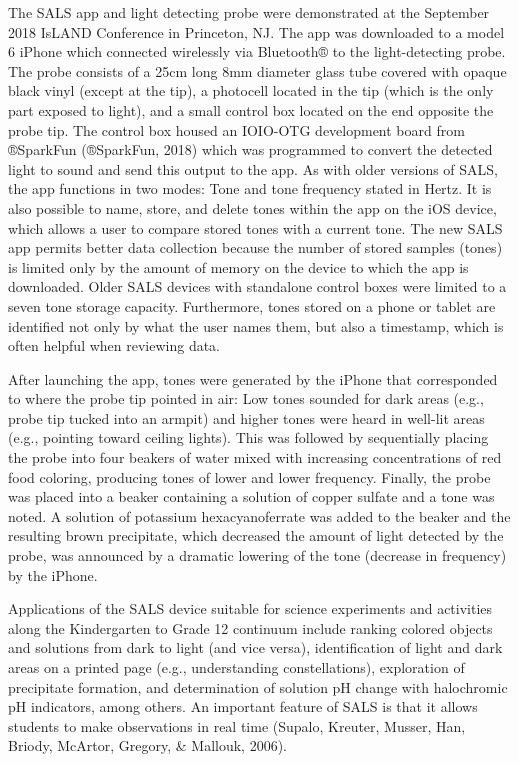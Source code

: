 \documentclass[11.5pt]{sig-alternate} %
\begin{document}
\begin{large}
The SALS app and light detecting probe were demonstrated at the September 2018 IsLAND Conference in Princeton, NJ. The app was downloaded to a model 6 iPhone which connected wirelessly via Bluetooth® to the light-detecting probe. The probe consists of a 25cm long 8mm diameter glass tube covered with opaque black vinyl (except at the tip), a photocell located in the tip (which is the only part exposed to light), and a small control box located on the end opposite the probe tip. The control box housed an IOIO-OTG development board from ®SparkFun (®SparkFun, 2018) which was programmed to convert the detected light to sound and send this output to the app. As with older versions of SALS, the app functions in two modes: Tone and tone frequency stated in Hertz. It is also possible to name, store, and delete tones within the app on the iOS device, which allows a user to compare stored tones with a current tone. The new SALS app permits better data collection because the number of stored samples (tones) is limited only by the amount of memory on the device to which the app is downloaded. Older SALS devices with standalone control boxes were limited to a seven tone storage capacity. Furthermore, tones stored on a phone or tablet are identified not only by what the user names them, but also a timestamp, which is often helpful when reviewing data.
    
After launching the app, tones were generated by the iPhone that corresponded to where the probe tip pointed in air: Low tones sounded for dark areas (e.g., probe tip tucked into an armpit) and higher tones were heard in well-lit areas (e.g., pointing toward ceiling lights). This was followed by sequentially placing the probe into four beakers of water mixed with increasing concentrations of red food coloring, producing tones of lower and lower frequency. Finally, the probe was placed into a beaker containing a solution of copper sulfate and a tone was noted. A solution of potassium hexacyanoferrate was added to the beaker and the resulting brown precipitate, which decreased the amount of light detected by the probe, was announced by a dramatic lowering of the tone (decrease in frequency) by the iPhone. 

Applications of the SALS device suitable for science experiments and activities along the Kindergarten to Grade 12 continuum include ranking colored objects and solutions from dark to light (and vice versa), identification of light and dark areas on a printed page (e.g., understanding constellations), exploration of precipitate formation, and determination of solution pH change with halochromic pH indicators, among others. An important feature of SALS is that it allows students to make observations in real time (Supalo, Kreuter, Musser, Han, Briody, McArtor, Gregory, \& Mallouk, 2006).


\end{large}
\end{document}
